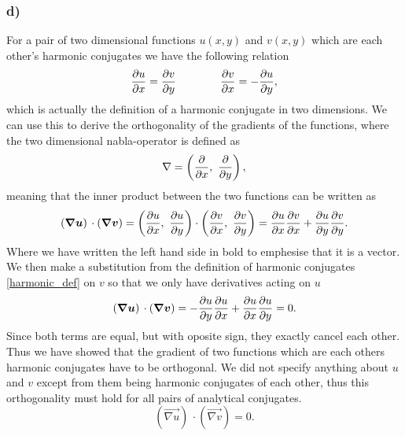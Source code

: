 \documentclass[12pt,twoside]{article}
\begin{document}
\subsubsection*{d)}
For a pair of two dimensional functions $u(x, y)$ and $v(x, y)$ which are each other's harmonic conjugates we have the following relation
\begin{equation}
  \pdv{u}{x} = \pdv{v}{y} \qquad \qquad \pdv{v}{x} = - \pdv{u}{y}, \label{harmonic_def}
\end{equation}
which is actually the definition of a harmonic conjugate in two dimensions.
We can use this to derive the orthogonality of the gradients of the functions, where the two dimensional nabla-operator is defined as
\begin{equation}
  \nabla = \left( \pdv{}{x}, \,\, \pdv{}{y} \right),
\end{equation}
meaning that the inner product between the two functions can be written as
\begin{equation}
  \left( {\boldsymbol{{ \nabla u}}} \right) \,\cdot   \left( {\boldsymbol{{ \nabla v}}} \right) = \left( \pdv{u}{x}, \,\, \pdv{u}{y} \right)\cdot \left( \pdv{v}{x}, \,\, \pdv{v}{y} \right) = \pdv{u}{x}\pdv{v}{x} + \pdv{u}{y}\pdv{v}{y}.
\end{equation}
Where we have written the left hand side in bold to emphesise that it is a vector. We then make a substitution from the definition of harmonic conjugates \eqref{harmonic_def} on $v$ so that we only have derivatives acting on $u$
\begin{equation}
  \left( {\boldsymbol{{ \nabla u}}} \right) \,\cdot   \left( {\boldsymbol{{ \nabla v}}} \right) = -\pdv{u}{y}\pdv{u}{x} + \pdv{u}{x}\pdv{u}{y} = 0.
\end{equation}
Since both terms are equal, but with oposite sign, they exactly cancel each other. Thus we have showed that the gradient of two functions which are each others harmonic conjugates have to be orthogonal. We did not specify anything about $u$ and $v$ except from them being harmonic conjugates of each other, thus this orthogonality must hold for all pairs of analytical conjugates.
\begin{equation}
  \left( \vec{ \nabla u} \right) \,\cdot   \left( \vec{ \nabla v} \right) = 0. \label{ortogonality_harmo}
\end{equation}
\end{document}
